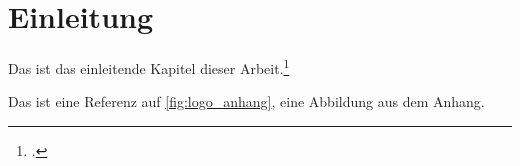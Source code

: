 \section{Einleitung}\label{sec:einleitung}

Das ist das einleitende Kapitel dieser Arbeit.\footcite[347]{einstein}

Das ist eine Referenz auf \autoref{fig:logo_anhang}, eine Abbildung aus dem Anhang.